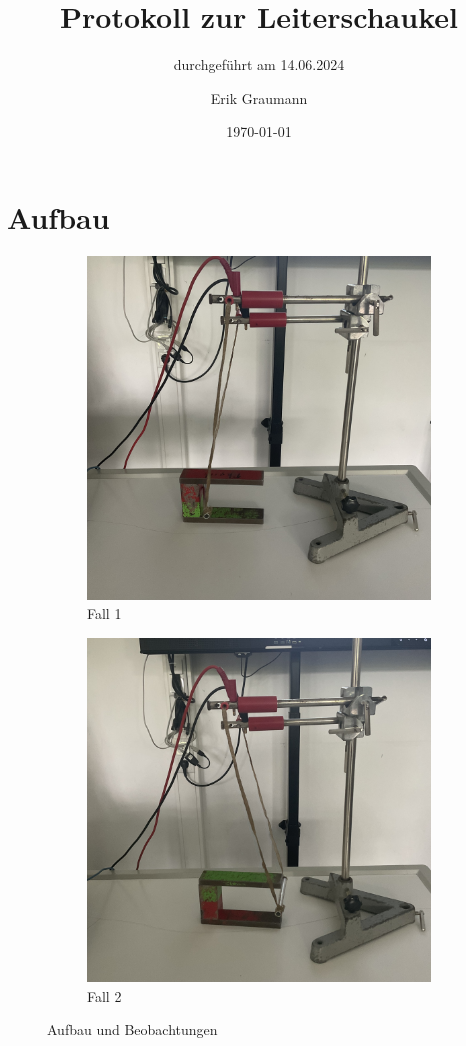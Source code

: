 \documentclass[
	fontsize=11pt,
	paper=a4,
	pagesize=auto,
	parskip=half,
	titlepage=on,
	ngerman
]{scrartcl}
\begin{document}
\title{Protokoll zur Leiterschaukel}
\subtitle{durchgeführt am 14.06.2024}
\author{Erik Graumann}
\date{\today}
\maketitle
\newpage

\tableofcontents
\newpage

\section{Aufbau}

\begin{figure}[h]
	\begin{subfigure}{.5\textwidth}
		\centering
		\includegraphics[width=.8\linewidth, angle=270]{IMG_1459.jpeg}
		\caption{Fall 1}
		\label{fig:fall1}
	\end{subfigure}%
	\begin{subfigure}{.5\textwidth}
		\centering
		\includegraphics[width=.8\linewidth, angle=270]{IMG_1457.jpeg}
		\caption{Fall 2}
		\label{fig:fall2}
	\end{subfigure}
	\caption{Aufbau und Beobachtungen}
	\label{fig:aufbau}
\end{figure}
\end{document}

